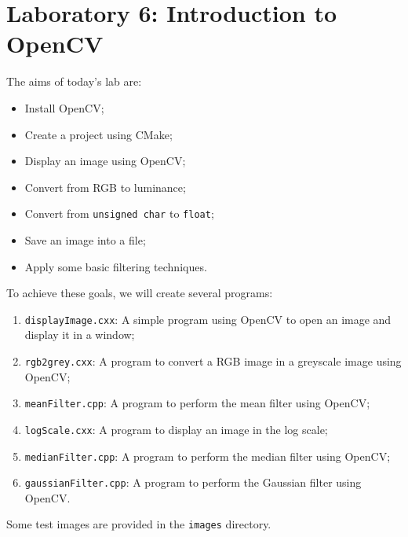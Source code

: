 \documentclass[english,a4paper,12pt,oneside]{article}
\begin{document}
\section*{Laboratory 6: Introduction to OpenCV}


The aims of today's lab are:
\begin{itemize}
	\item Install OpenCV;
	\item Create a project using CMake;
	\item Display an image using OpenCV;
	\item Convert from RGB to luminance;
	\item Convert from \verb|unsigned char| to \verb|float|;
	\item Save an image into a file;
	\item Apply some basic filtering techniques.
\end{itemize}

To achieve these goals, we will create several programs:
\begin{enumerate}
	\item \verb+displayImage.cxx+:   A simple program using OpenCV to open an image and display it in a window;
	\item \verb+rgb2grey.cxx+:       A program to convert a RGB image in a greyscale image using OpenCV;
	\item \verb+meanFilter.cpp+:     A program to perform the mean filter using OpenCV;
	\item \verb+logScale.cxx+:       A program to display an image in the log scale;
	\item \verb+medianFilter.cpp+:   A program to perform the median filter using OpenCV;
	\item \verb+gaussianFilter.cpp+: A program to perform the Gaussian filter using OpenCV.
\end{enumerate}

Some test images are provided in the \verb+images+ directory.


\end{document}
